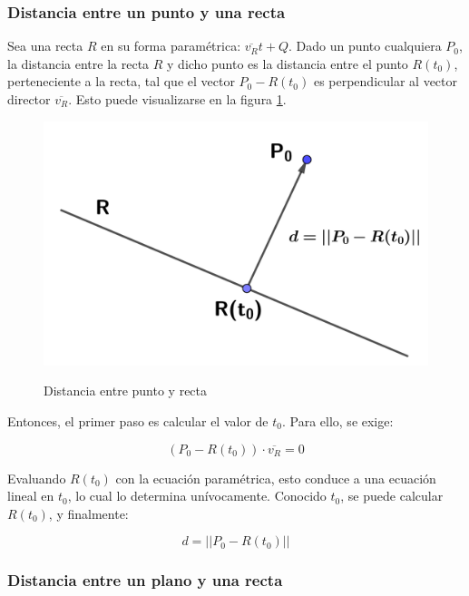 \documentclass{article}
\begin{document}
\subsubsection{Distancia entre un punto y una recta}

Sea una recta $R$ en su forma paramétrica: $\overline{v_R} t + Q$. Dado un punto cualquiera $P_0$, la distancia entre la recta $R$ y dicho punto es la distancia entre el punto $R(t_0)$, perteneciente a la recta, tal que el vector $P_0 - R(t_0)$ es perpendicular al vector director $\overline{v_R}$. Esto puede visualizarse en la figura \ref{fig:distanciarecta}.

\begin{figure}[ht]
\caption{Distancia entre punto y recta}
\includegraphics[scale=0.8]{img/rn/distancia_punto_recta.png} 
\centering
\label{fig:distanciarecta}
\end{figure}

Entonces, el primer paso es calcular el valor de $t_0$. Para ello, se exige:

\begin{equation}
(P_0 - R(t_0)) \cdot \overline{v_R} = 0
\end{equation}

Evaluando $R(t_0)$ con la ecuación paramétrica, esto conduce a una ecuación lineal en $t_0$, lo cual lo determina unívocamente. Conocido $t_0$, se puede calcular $R(t_0)$, y finalmente:

\begin{equation}
d = ||P_0 - R(t_0)||
\end{equation}

\subsubsection{Distancia entre un plano y una recta}
\end{document}
